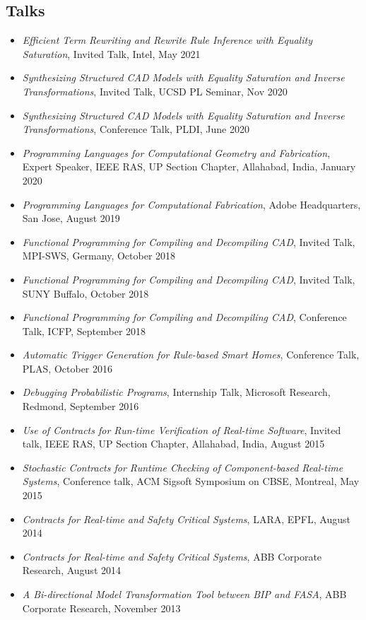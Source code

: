 \documentclass[margin, 10pt]{res} %
\begin{document}
\begin{resume}
\section{Talks}
 \begin{itemize}[itemsep=.7pt]
 \item {\sl Efficient Term Rewriting and Rewrite Rule Inference with Equality Saturation}, Invited Talk, Intel, May 2021
 \item {\sl Synthesizing Structured CAD Models with Equality Saturation and Inverse Transformations}, Invited Talk, UCSD PL Seminar, Nov 2020
 \item {\sl Synthesizing Structured CAD Models with Equality Saturation and Inverse Transformations}, Conference Talk, PLDI, June 2020
 \item {\sl Programming Languages for Computational Geometry and Fabrication}, Expert Speaker, IEEE RAS, UP Section Chapter, Allahabad, India, January 2020
 \item {\sl Programming Languages for Computational Fabrication}, Adobe Headquarters, San Jose, August 2019
 \item {\sl Functional Programming for Compiling and Decompiling CAD}, Invited Talk, MPI-SWS, Germany, October 2018
 \item {\sl Functional Programming for Compiling and Decompiling CAD}, Invited Talk, SUNY Buffalo, October 2018
 \item {\sl Functional Programming for Compiling and Decompiling CAD}, Conference  Talk, ICFP, September 2018
 \item {\sl Automatic Trigger Generation for Rule-based Smart Homes}, Conference Talk, PLAS, October 2016
 \item {\sl Debugging Probabilistic Programs}, Internship Talk, Microsoft Research, Redmond, September 2016
 \item {\sl Use of Contracts for Run-time Verification of Real-time Software}, Invited talk, IEEE RAS, UP Section Chapter, Allahabad, India, August 2015
 \item {\sl Stochastic Contracts for Runtime Checking of Component-based Real-time Systems}, Conference talk, ACM Sigsoft Symposium on CBSE, Montreal, May 2015
 \item {\sl Contracts for Real-time and Safety Critical Systems}, LARA, EPFL, August 2014
 \item {\sl Contracts for Real-time and Safety Critical Systems}, ABB Corporate Research, August 2014
 \item {\sl A Bi-directional Model Transformation Tool between BIP and FASA}, ABB Corporate Research, November 2013
 \end{itemize}


\end{resume}
\end{document}
